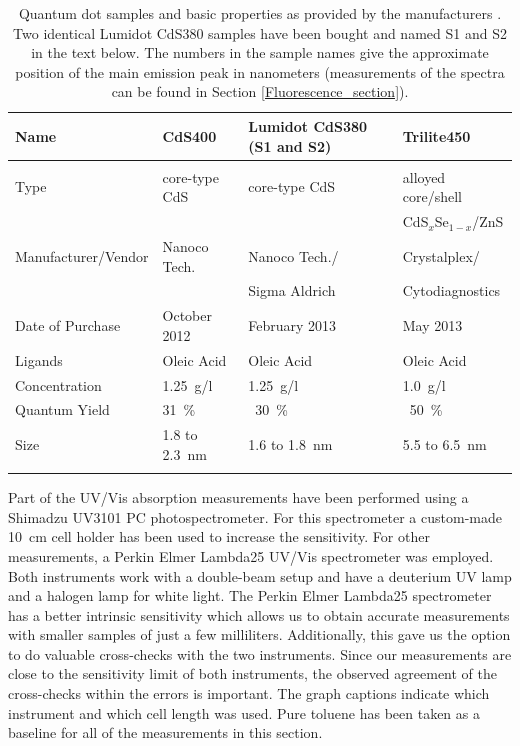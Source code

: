 \documentclass[cits]{JINST}
\begin{document}
\begin{table}[th]
\caption{Quantum dot samples and basic properties as provided by the manufacturers \cite{nanoco, sigma, cytodiagnostics, crystalplex}. Two identical Lumidot CdS380 samples have been bought and named S1 and S2 in the text below. The numbers in the sample names give the approximate position of the main emission peak in nanometers (measurements of the spectra can be found in Section \protect\ref{Fluorescence_section}).}
  \begin{center}
    \begin{tabular}{llll}
      Name & CdS400 & Lumidot CdS380 (S1 and S2)& Trilite450 \\
      \hline\hline\\[-5px]
      Type & core-type CdS & core-type CdS & alloyed core/shell \\ 
           &               &               & CdS$_x$Se$_{1-x}$/ZnS \\
      Manufacturer/Vendor & Nanoco Tech. & Nanoco Tech./ & Crystalplex/ \\
                          &              & Sigma Aldrich & Cytodiagnostics \\
      Date of Purchase & October 2012 & February 2013 & May 2013 \\
      Ligands & Oleic Acid & Oleic Acid & Oleic Acid \\
      Concentration & 1.25~g/l & 1.25~g/l & 1.0~g/l \\
      Quantum Yield & 31~\% & ~30~\%  & ~50~\% \\
      Size & 1.8 to 2.3~nm & 1.6 to 1.8~nm & 5.5 to 6.5~nm\\[5px] 
      \hline
    \label{samples_table}
    \end{tabular}
  \end{center}
\end{table}

Part of the UV/Vis absorption measurements have been performed using a Shimadzu UV3101 PC photospectrometer. For this spectrometer a custom-made 10~cm cell holder has been used to increase the sensitivity. For other measurements, a Perkin Elmer Lambda25 UV/Vis spectrometer was employed. Both instruments work with a double-beam setup and have a deuterium UV lamp and a halogen lamp for white light. The Perkin Elmer Lambda25 spectrometer has a better intrinsic sensitivity which allows us to obtain accurate measurements with smaller samples of just a few milliliters. Additionally, this gave us the option to do valuable cross-checks with the two instruments. Since our measurements are close to the sensitivity limit of both instruments, the observed agreement of the cross-checks within the errors is important. The graph captions indicate which instrument and which cell length was used. Pure toluene has been taken as a baseline for all of the measurements in this section. 
\end{document}
